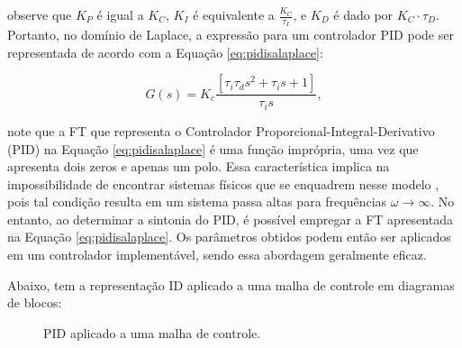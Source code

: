 \documentclass[12pt,           %
a4paper,                       %
openany,                       %
oneside,                       %
chapter=TITLE,                 %
english,                       %
spanish,                       %
brazil,                        %
sumario=tradicional]{abntex2}  %
\begin{document}
\begin{OnehalfSpace}
\noindent observe que \(K_P\) é igual a \(K_C\), \(K_I\) é equivalente a \(\frac{K_C}{\tau_I}\), e \(K_D\) é dado por \(K_C \cdot \tau_D\). Portanto, no domínio de Laplace, a expressão para um controlador PID pode ser representada de acordo com a Equação \ref{eq:pidisalaplace}:

\begin{equation}%
     \label{eq:pidisalaplace}
        G(s) = K_c\frac{[\tau_i \tau_d s^2 + \tau_i s + 1]}{\tau_i s},
\end{equation}

\noindent note que a FT que representa o Controlador Proporcional-Integral-Derivativo (PID) na Equação \ref{eq:pidisalaplace} é uma função imprópria, uma vez que apresenta dois zeros e apenas um polo. Essa característica implica na impossibilidade de encontrar sistemas físicos que se enquadrem nesse modelo \cite{aguirre2004}, pois tal condição resulta em um sistema passa altas para frequências $\omega \rightarrow \infty$. No entanto, ao determinar a sintonia do PID, é possível empregar a FT apresentada na Equação \ref{eq:pidisalaplace}. Os parâmetros obtidos podem então ser aplicados em um controlador implementável, sendo essa abordagem geralmente eficaz.

Abaixo, tem a representação ID aplicado a uma malha de controle em diagramas de blocos:

\begin{figure}[H]
\vspace*{-0.2cm}
\centering
\caption{PID aplicado a uma malha de controle.}
    \label{fig:pidmf}
\end{figure}
\vspace*{-0.7cm}
{\raggedright {}}


\end{OnehalfSpace}
\end{document}
